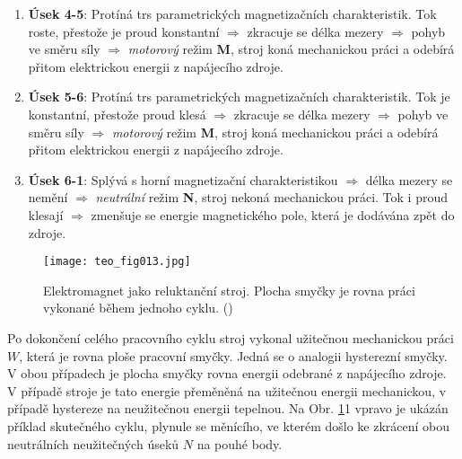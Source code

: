 {\begin{enumerate}
        \item \textbf{Úsek 4-5}: Protíná trs parametrických magnetizačních charakteristik. Tok 
          roste, přestože je proud konstantní \(\Rightarrow\) zkracuje se délka mezery 
          \(\Rightarrow\) pohyb ve směru síly \(\Rightarrow\) \emph{motorový} režim \textbf{M}, 
          stroj koná mechanickou práci a odebírá přitom elektrickou energii z napájecího zdroje.
        
        \item \textbf{Úsek 5-6}: Protíná trs parametrických magnetizačních charakteristik. Tok je 
          konstantní, přestože proud klesá \(\Rightarrow\) zkracuje se délka mezery \(\Rightarrow\) 
          pohyb ve směru síly \(\Rightarrow\) \emph{motorový} režim \textbf{M}, stroj koná 
          mechanickou práci a odebírá přitom elektrickou energii z napájecího zdroje.
        
        \item \textbf{Úsek 6-1}: Splývá s horní magnetizační charakteristikou \(\Rightarrow\) délka 
          mezery se nemění \(\Rightarrow\) \emph{neutrální} režim \textbf{N}, stroj nekoná 
          mechanickou práci. Tok i proud klesají \(\Rightarrow\) zmenšuje se energie magnetického 
          pole, která je dodávána zpět do zdroje.
      \end{enumerate}
      
      \begin{figure}[ht!] %
        \centering
        \texttt{[image: teo\_fig013.jpg]}
        \caption{Elektromagnet jako reluktanční stroj. Plocha smyčky je rovna práci vykonané během
                 jednoho cyklu.
                 (\cite[s.~164]{Patocka4})}
        \label{teo:fig013}
      \end{figure}

      Po dokončení celého pracovního cyklu stroj vykonal užitečnou mechanickou práci \(W\), která 
      je rovna ploše pracovní smyčky. Jedná se o analogii hysterezní smyčky. V obou případech je 
      plocha smyčky rovna energii odebrané z napájecího zdroje. V případě stroje je tato energie 
      přeměněná na užitečnou energii mechanickou, v případě hystereze na neužitečnou energii 
      tepelnou. Na Obr. \ref{teo:fig013}1 vpravo je ukázán příklad skutečného cyklu, plynule se 
      měnícího, ve kterém došlo ke zkrácení obou neutrálních neužitečných úseků \(N\) na pouhé body.

}
